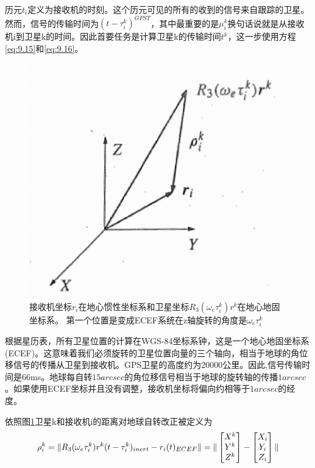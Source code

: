 	历元$t_i$定义为接收机的时刻。这个历元可见的所有的收到的信号来自跟踪的卫星。然而，信号的传输时间为$(t-\tau ^k_i)^{GPST}$，其中最重要的是$\mu ^k_i$换句话说就是从接收机i到卫星k的时间。因此首要任务是计算卫星k的传输时间$t^k$，这一步使用方程\ref{eq:9.15}和\ref{eq:9.16}。
	\begin{figure}
		\centering
		\includegraphics[width=0.7\linewidth]{TeX_files/Part03/chapter09/image/9-12}
		\caption{接收机坐标$r_i$在地心惯性坐标系和卫星坐标$R_3(\omega_e \tau ^k_i)r^k$在地心地固坐标系。 第一个位置是变成ECEF系统在z轴旋转的角度是$\omega_e \tau ^k_i$}
		\label{fig:9-12}
	\end{figure}
	
	根据星历表，所有卫星位置的计算在WGS-84坐标系钟，这是一个地心地固坐标系(ECEF)。这意味着我们必须旋转的卫星位置向量的三个轴向，相当于地球的角位移信号的传播从卫星到接收机。GPS卫星的高度约为20000公里。因此,信号传输时间是66ms。地球每自转$15arcsec$的角位移信号相当于地球的旋转轴的传播$1arcsec$。如果使用ECEF坐标并且没有调整，接收机坐标将偏向约相等于$1arcsec$的经度。
	
	依照图\ref{fig:9-12}卫星k和接收机i的距离对地球自转改正被定义为
	\begin{equation}\label{eq:9.17}
	\rho ^k_i = \Arrowvert R_3(\omega_e\tau^k_i)r^k(t-\tau^k_i)_{inert}-r_i(t)_{ECEF} \Arrowvert = 
	\Arrowvert \begin{bmatrix}
	X^k \\ Y^k \\ Z^k
	\end{bmatrix}-
	\begin{bmatrix}
	X_i \\ Y_i \\ Z_i
	\end{bmatrix} \Arrowvert
	\end{equation}
	
